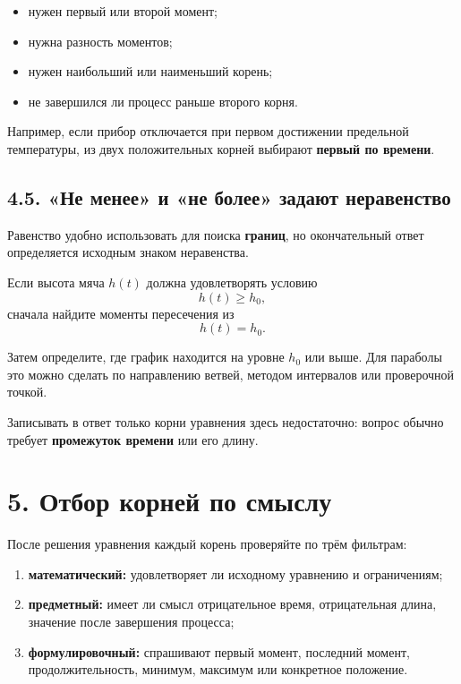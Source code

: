 \documentclass[a4paper,12pt]{article}
\newcommand{\sectionline}{\par\vspace{0.3em}{\color{accent}\hrule height 0.7pt}\vspace{0.7em}}
\newcommand{\key}[1]{\textbf{\color{darkaccent}#1}}
\begin{document}
\begin{itemize}
  \item нужен первый или второй момент;
  \item нужна разность моментов;
  \item нужен наибольший или наименьший корень;
  \item не завершился ли процесс раньше второго корня.
\end{itemize}

Например, если прибор отключается при первом достижении предельной температуры, из двух положительных корней выбирают \textbf{первый по времени}.

\subsection*{4.5. «Не менее» и «не более» задают неравенство}

Равенство удобно использовать для поиска \textbf{границ}, но окончательный ответ определяется исходным знаком неравенства.

Если высота мяча $h(t)$ должна удовлетворять условию
\[
h(t)\ge h_0,
\]
сначала найдите моменты пересечения из
\[
h(t)=h_0.
\]

Затем определите, где график находится на уровне $h_0$ или выше. Для параболы это можно сделать по направлению ветвей, методом интервалов или проверочной точкой.

Записывать в ответ только корни уравнения здесь недостаточно: вопрос обычно требует \textbf{промежуток времени} или его длину.

\section*{5. Отбор корней по смыслу}
\sectionline

После решения уравнения каждый корень проверяйте по трём фильтрам:

\begin{enumerate}
  \item \key{математический:} удовлетворяет ли исходному уравнению и ограничениям;
  \item \key{предметный:} имеет ли смысл отрицательное время, отрицательная длина, значение после завершения процесса;
  \item \key{формулировочный:} спрашивают первый момент, последний момент, продолжительность, минимум, максимум или конкретное положение.
\end{enumerate}
\end{document}
